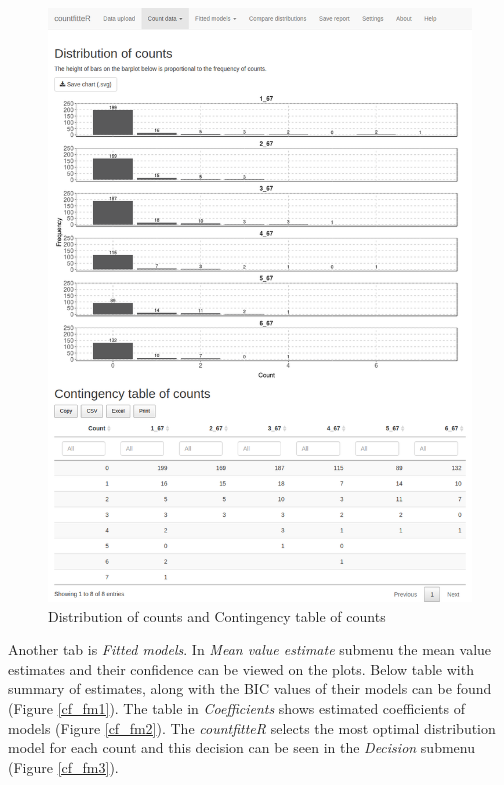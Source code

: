 \begin{figure}[htbp]
  \centering
  \includegraphics[width=0.99\columnwidth]{fig/cf_cd3.png}
  \caption{Distribution of counts and Contingency table of counts}
    \label{cf_cd3}
\end{figure}

Another tab is \textit{Fitted models}. In \textit{Mean value estimate} submenu the mean value estimates and their confidence can be viewed on the plots. Below table with summary of estimates, along with the BIC values of their models can be found (Figure \ref{cf_fm1}). The table in \textit{Coefficients} shows estimated coefficients of models (Figure \ref{cf_fm2}). The \emph{countfitteR} selects the most optimal distribution model for each count and this decision can be seen in the \textit{Decision} submenu (Figure \ref{cf_fm3}).


